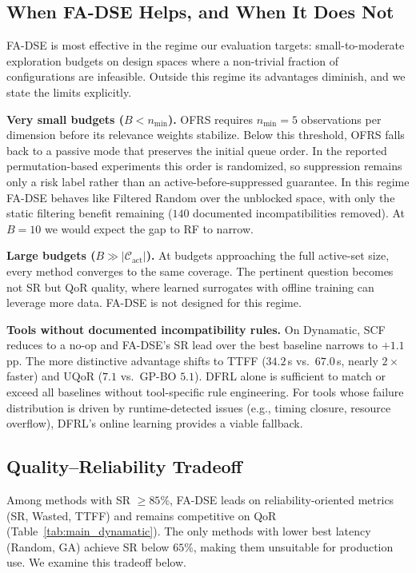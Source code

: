 \documentclass[journal]{IEEEtran}
\begin{document}
\subsection{When FA-DSE Helps, and When It Does Not}

FA-DSE is most effective in the regime our evaluation targets: small-to-moderate exploration budgets on design spaces where a non-trivial fraction of configurations are infeasible. Outside this regime its advantages diminish, and we state the limits explicitly.

\textbf{Very small budgets ($B < n_{\min}$).} OFRS requires $n_{\min}{=}5$ observations per dimension before its relevance weights stabilize. Below this threshold, OFRS falls back to a passive mode that preserves the initial queue order. In the reported permutation-based experiments this order is randomized, so suppression remains only a risk label rather than an active-before-suppressed guarantee. In this regime FA-DSE behaves like Filtered Random over the unblocked space, with only the static filtering benefit remaining ($140$ documented incompatibilities removed). At $B{=}10$ we would expect the gap to RF to narrow.

\textbf{Large budgets ($B \gg |\mathcal{C}_{\text{act}}|$).} At budgets approaching the full active-set size, every method converges to the same coverage. The pertinent question becomes not SR but QoR quality, where learned surrogates with offline training can leverage more data. FA-DSE is not designed for this regime.

\textbf{Tools without documented incompatibility rules.} On Dynamatic, SCF reduces to a no-op and FA-DSE's SR lead over the best baseline narrows to $+1.1$\,pp. The more distinctive advantage shifts to TTFF ($34.2$\,s vs.\ $67.0$\,s, nearly $2\times$ faster) and UQoR ($7.1$ vs.\ GP-BO $5.1$). DFRL alone is sufficient to match or exceed all baselines without tool-specific rule engineering. For tools whose failure distribution is driven by runtime-detected issues (e.g., timing closure, resource overflow), DFRL's online learning provides a viable fallback.

\subsection{Quality--Reliability Tradeoff}
\label{sec:tradeoff}

Among methods with SR $\geq 85\%$, FA-DSE leads on reliability-oriented metrics (SR, Wasted, TTFF) and remains competitive on QoR (Table~\ref{tab:main_dynamatic}). The only methods with lower best latency (Random, GA) achieve SR below $65\%$, making them unsuitable for production use. We examine this tradeoff below.
\end{document}
